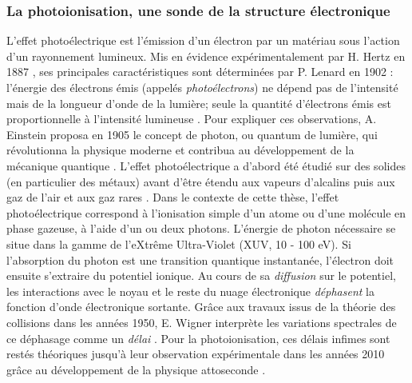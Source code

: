 \subsubsection*{La photoionisation, une sonde de la structure électronique}
L'effet photoélectrique est l'émission d'un électron par un matériau sous l'action d'un rayonnement lumineux. Mis en évidence expérimentalement par H. Hertz en 1887 , ses principales caractéristiques sont déterminées par P. Lenard en 1902 : l'énergie des électrons émis (appelés \textit{photoélectrons}) ne dépend pas de l'intensité mais de la longueur d'onde de la lumière; seule la quantité d'électrons émis est proportionnelle à l'intensité lumineuse . Pour expliquer ces observations, A. Einstein proposa en 1905 le concept de photon, ou quantum de lumière, qui révolutionna la physique moderne et contribua au développement de la mécanique quantique . L'effet photoélectrique a d'abord été étudié sur des solides (en particulier des métaux) avant d'être étendu aux vapeurs d'alcalins puis aux gaz de l'air et aux gaz rares . Dans le contexte de cette thèse, l'effet photoélectrique correspond à l'ionisation simple d'un atome ou d'une molécule en phase gazeuse, à l'aide d'un ou deux photons. L'énergie de photon nécessaire se situe dans la gamme de l'eXtrême Ultra-Violet (XUV, 10 - 100 eV). Si l'absorption du photon est une transition quantique instantanée, l'électron doit ensuite s'extraire du potentiel ionique. Au cours de sa \textit{diffusion} sur le potentiel, les interactions avec le noyau et le reste du nuage électronique \textit{déphasent} la fonction d'onde électronique sortante. Grâce aux travaux issus de la théorie des collisions dans les années 1950, E. Wigner interprète les variations spectrales de ce déphasage comme un \textit{délai} . Pour la photoionisation, ces délais infimes sont restés théoriques jusqu'à leur observation expérimentale dans les années 2010 grâce au développement de la physique attoseconde . 

